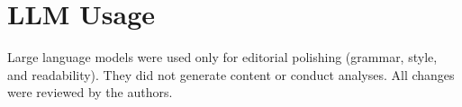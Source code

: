 
\section{LLM Usage}

Large language models were used only for editorial polishing (grammar, style, and readability). They did not generate content or conduct analyses. All changes were reviewed by the authors.
